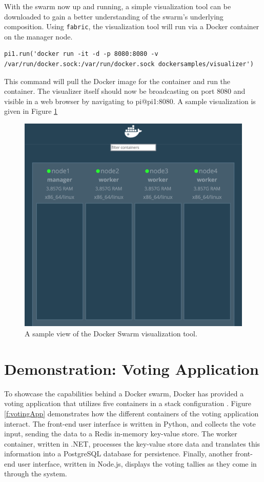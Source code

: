 \documentclass[sigconf]{acmart}
\begin{document}
With the swarm now up and running, a simple visualization tool can be downloaded to gain a better understanding of the swarm's underlying composition. Using {\tt fabric}, the visualization tool will run via a Docker container on the manager node.

\begin{lstlisting}
pi1.run('docker run -it -d -p 8080:8080 -v /var/run/docker.sock:/var/run/docker.sock dockersamples/visualizer')
\end{lstlisting}

\setlength{\parskip}{1em}\noindent This command will pull the Docker image for the container and run the container. The visualizer itself should now be broadcasting on port 8080 and visible in a web browser by navigating to pi@pi1:8080. A sample visualization is given in Figure \ref{f:visualizer}
\begin{figure}[!ht]
  \centering\includegraphics[width=\columnwidth]{images/visualizer.png}
  \caption{A sample view of the Docker Swarm visualization tool.}\label{f:visualizer}
\end{figure}

\section{Demonstration: Voting Application}

To showcase the capabilities behind a Docker swarm, Docker has provided a voting application that utilizes five containers in a stack configuration \cite{votingapp2017}. Figure \ref{f:votingApp} demonstrates how the different containers of the voting application interact. The front-end user interface is written in Python, and collects the vote input, sending the data to a Redis in-memory key-value store. The worker container, written in .NET, processes the key-value store data and translates this information into a PostgreSQL database for persistence. Finally, another front-end user interface, written in Node.js, displays the voting tallies as they come in through the system.
\end{document}
